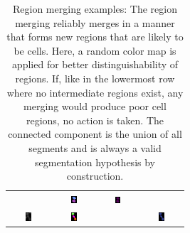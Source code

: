 \begin{table}
\begin{tabular}{cccc}
        & \includegraphics[width=0.15\textwidth]{images/joint/overseg/75/02/colored01_all.png}
        & \includegraphics[width=0.15\textwidth]{images/joint/overseg/75/02/colored02.png} \\
        \includegraphics[width=0.15\textwidth]{images/joint/overseg/85/02/raw.png}
        & \includegraphics[width=0.15\textwidth]{images/joint/overseg/85/02/colored00.png}
        & %
        & \includegraphics[width=0.15\textwidth]{images/joint/overseg/85/02/colored01.png} \\
        \bottomrule
    \end{tabular}
    \caption[Region merging examples]{Region merging examples: The region merging reliably merges in
        a manner that forms new regions that are likely to be cells.  Here, a random color map is
        applied for better distinguishability of regions. If, like in the lowermost row
        where no intermediate regions exist,
        any merging would produce poor cell regions, no action is taken. The connected component is
        the union of all segments and is always a valid segmentation hypothesis by construction.}
    \label{tab:joint-region-merging-examples}
\end{table}



